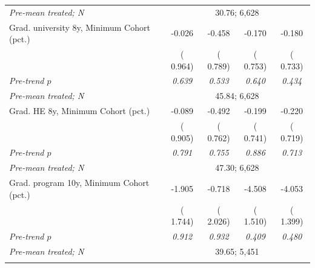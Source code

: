\begin{tabular}{lcccc}
\quad \textit{Pre-mean treated; N} & \multicolumn{4}{c}{\scriptsize   30.76;  6,628} \\
\addlinespace
Grad. university 8y, Minimum Cohort (pct.) &  -0.026 &  -0.458 &  -0.170 &  -0.180 \\
 & ( 0.964) & ( 0.789) & ( 0.753) & ( 0.733) \\
\quad \textit{Pre-trend \(p\)} & \textit{0.639} & \textit{0.533} & \textit{0.640} & \textit{0.434} \\
\quad \textit{Pre-mean treated; N} & \multicolumn{4}{c}{\scriptsize   45.84;  6,628} \\
\addlinespace
Grad. HE 8y, Minimum Cohort (pct.) &  -0.089 &  -0.492 &  -0.199 &  -0.220 \\
 & ( 0.905) & ( 0.762) & ( 0.741) & ( 0.719) \\
\quad \textit{Pre-trend \(p\)} & \textit{0.791} & \textit{0.755} & \textit{0.886} & \textit{0.713} \\
\quad \textit{Pre-mean treated; N} & \multicolumn{4}{c}{\scriptsize   47.30;  6,628} \\
\addlinespace
Grad. program 10y, Minimum Cohort (pct.) &  -1.905 &  -0.718 &  -4.508\sym{***} &  -4.053\sym{***} \\
 & ( 1.744) & ( 2.026) & ( 1.510) & ( 1.399) \\
\quad \textit{Pre-trend \(p\)} & \textit{0.912} & \textit{0.932} & \textit{0.409} & \textit{0.480} \\
\quad \textit{Pre-mean treated; N} & \multicolumn{4}{c}{\scriptsize   39.65;  5,451} \\
\addlinespace
\bottomrule
\end{tabular}
